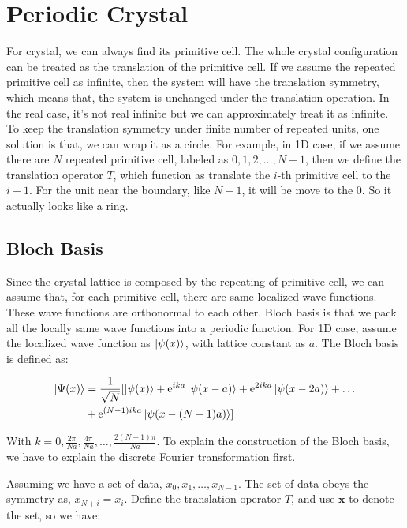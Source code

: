 \documentclass[../main.tex]{subfiles}
\begin{document}
\section{\textbf{Periodic Crystal}}

For crystal, we can always find its primitive cell. The whole crystal configuration can be treated as the translation of the primitive cell. If we assume the repeated primitive cell as infinite, then the system will have the translation symmetry, which means that, the system is unchanged under the translation operation. In the real case, it's not real infinite but we can approximately treat it as infinite. To keep the translation symmetry under finite number of repeated units, one solution is that, we can wrap it as a circle. For example, in 1D case, if we assume there are $N$ repeated primitive cell, labeled as $0, 1, 2, \dots, N -1$, then we define the translation operator $T$, which function as translate the $i$-th primitive cell to the $i+1$. For the unit near the boundary, like $N-1$, it will be move to the $0$. So it actually looks like a ring.

\subsection{Bloch Basis}

Since the crystal lattice is composed by the repeating of primitive cell, we can assume that, for each primitive cell, there are same localized wave functions. These wave functions are orthonormal to each other. Bloch basis is that we pack all the locally same wave functions into a periodic function. For 1D case, assume the localized wave function as $\ket{\psi(x)}$, with lattice constant as $a$. The Bloch basis is defined as:

\begin{align}
    \ket{\Psi(x)} &= \frac{1}{\sqrt{N}} [\ket{\psi(x)} + \textrm{e}^{ika}\ket{\psi(x - a)} + \textrm{e}^{2ika}\ket{\psi(x - 2a)} + \dots\nonumber\\ &+ \textrm{e}^{(N-1)ika}\ket{\psi(x - (N - 1)a)}]
\end{align}

With $k = 0, \frac{2\pi}{Na}, \frac{4\pi}{Na},\dots, \frac{2(N-1)\pi}{Na}$. To explain the construction of the Bloch basis, we have to explain the discrete Fourier transformation first.

Assuming we have a set of data, ${x_0, x_1, \dots, x_{N-1}}$. The set of data obeys the symmetry as, $x_{N + i} = x_i$. Define the translation operator $T$, and use $\bm{x}$ to denote the set, so we have:
\end{document}
